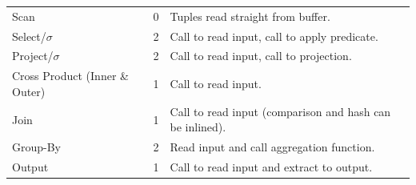 \begin{center}
  \begin{tabular}{l l p{}}
    Scan & 0 & Tuples read straight from buffer. \\
    Select/$\sigma$ & 2 & Call to read input, call to apply predicate. \\
    Project/$\sigma$ & 2 & Call to read input, call to projection. \\
    Cross Product (Inner \& Outer) & 1 & Call to read input. \\
    Join & 1 & Call to read input (comparison and hash can be inlined). \\
    Group-By & 2 & Read input and call aggregation function. \\
    Output & 1 & Call to read input and extract to output. \\
   \end{tabular}
\end{center}

